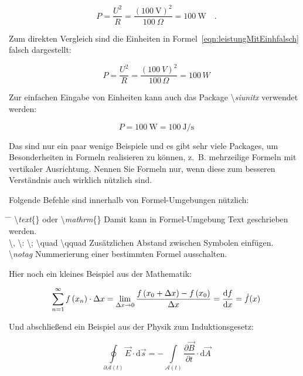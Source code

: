 \begin{equation}
P=\frac{U^2}{R} = \frac{\left( 100~\mathrm{V}\right)^2}{100~\Omega} = 100~\mathrm{W}\quad .
\label{eqn:leistungMitEinh}
\end{equation}

Zum direkten Vergleich sind die Einheiten in Formel~\ref{eqn:leistungMitEinhfalsch} falsch dargestellt:

\begin{equation}
P=\frac{U^2}{R} = \frac{\left( 100~V\right)^2}{100\,\varOmega} = 100\,W
\label{eqn:leistungMitEinhfalsch}
\end{equation}

Zur einfachen Eingabe von Einheiten kann auch das Package \textbackslash \textit{siunitx} verwendet werden:

\begin{equation}
	P=\SI{100}{\watt}=\SI{100}{\joule\per\second}
\end{equation}

Das sind nur ein paar wenige Beispiele und es gibt sehr viele Packages, um Besonderheiten in Formeln realisieren zu können, z.~B. mehrzeilige Formeln mit vertikaler Ausrichtung. Nennen Sie Formeln nur, wenn diese zum besseren Verständnis auch wirklich nützlich sind.

Folgende Befehle sind innerhalb von Formel-Umgebungen nützlich:
\begin{tabbing}
	\hspace*{0cm} \= \hspace{0.3\linewidth} \= \+\kill
	\textbackslash \textit{text}\{\} oder \textbackslash \textit{mathrm}\{\}	\> Damit kann in Formel-Umgebung Text geschrieben werden.\\ 
	\textbackslash, \textbackslash: \textbackslash; \textbackslash quad \textbackslash qquad \> Zusätzlichen Abstand zwischen Symbolen einfügen.\\
	\textbackslash \textit{notag} \> Nummerierung einer bestimmten Formel ausschalten.
\end{tabbing}

Hier noch ein kleines Beispiel aus der Mathematik:

\begin{equation}
\sum\limits_{n=1}^\infty f\left(x_n\right)\cdot \Delta x=  \lim\limits_{\Delta x \rightarrow 0} \frac{f\left(x_0+\Delta x\right)-f\left(x_0\right)}{\Delta x} = \frac{\mathop{}\!\mathrm{d} f}{\mathop{}\!\mathrm{d} x} = \dot{f}(x)
\end{equation}

Und abschließend ein Beispiel aus der Physik zum Induktionsgesetz:

\begin{equation}
\oint \limits _{\partial {\mathcal {\mathcal {A}}}(t)}{{\vec {E}}\cdot {\text{d}}{\vec {s}}}=-\int \limits _{{\mathcal {A}}(t)}{{\frac {\partial {\vec {B}}}{\partial t}}\cdot {\text{d}}{\vec {A}}}
\end{equation}

